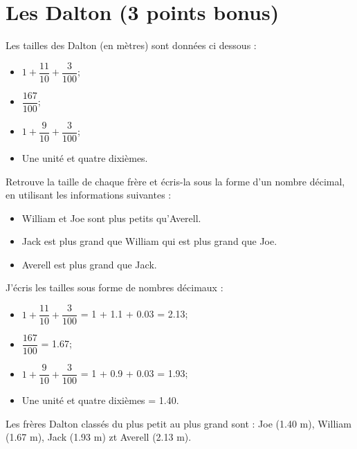 \section{Les Dalton (3 points bonus)}

Les tailles des Dalton (en mètres) sont données ci dessous :

\begin{itemize}
	\item $1 + \dfrac{11}{10} + \dfrac{3}{100}$;
	\item $\dfrac{167}{100}$;
	\item $1 + \dfrac{9}{10} + \dfrac{3}{100}$;
	\item Une unité et quatre dixièmes.
\end{itemize}

\begin{questions}
	\question[3] Retrouve la taille de chaque frère et écris-la sous la forme d'un nombre décimal, en utilisant les informations suivantes :
	
	\begin{itemize}
		\item William et Joe sont plus petits qu'Averell.
		\item Jack est plus grand que William qui est plus grand que Joe.
		\item Averell est plus grand que Jack.
	\end{itemize}

	\begin{solution}
		J'écris les tailles sous forme de nombres décimaux :
		\begin{itemize}
			\item $1 + \dfrac{11}{10} + \dfrac{3}{100}$ = 1 + \num{1.1} + \num{0.03} = \num{2.13};
			\item $\dfrac{167}{100}$ = \num{1.67};
			\item $1 + \dfrac{9}{10} + \dfrac{3}{100}$ = 1 + \num{0.9} + \num{0.03} = \num{1.93};
			\item Une unité et quatre dixièmes = \num{1.40}.
		\end{itemize}
	
		Les frères Dalton classés du plus petit au plus grand sont :
		Joe (\num{1.40}  m), William (\num{1.67} m), Jack (\num{1.93} m) zt Averell (\num{2.13} m).
	\end{solution}
\end{questions}